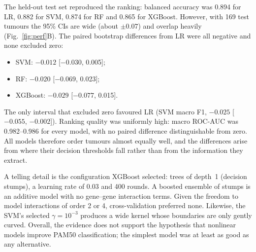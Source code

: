 \documentclass[10pt,twocolumn]{article}
\begin{document}
The held-out test set reproduced the ranking: balanced accuracy was 0.894 for LR, 0.882 for SVM, 0.874 for RF and 0.865 for XGBoost. However, with 169 test tumours the 95\% CIs are wide (about $\pm0.07$) and overlap heavily (Fig.~\ref{fig:perf}B). The paired bootstrap differences from LR were all negative and none excluded zero:
\begin{itemize}
\item SVM: $-0.012$ [$-0.030$, 0.005];
\item RF: $-0.020$ [$-0.069$, 0.023];
\item XGBoost: $-0.029$ [$-0.077$, 0.015].
\end{itemize}
The only interval that excluded zero favoured LR (SVM macro F1, $-0.025$ [$-0.055$, $-0.002$]). Ranking quality was uniformly high: macro ROC-AUC was 0.982--0.986 for every model, with no paired difference distinguishable from zero. All models therefore order tumours almost equally well, and the differences arise from where their decision thresholds fall rather than from the information they extract.

A telling detail is the configuration XGBoost selected: trees of depth~1 (decision stumps), a learning rate of 0.03 and 400 rounds. A boosted ensemble of stumps is an additive model with no gene--gene interaction terms. Given the freedom to model interactions of order 2 or 4, cross-validation preferred none. Likewise, the SVM's selected $\gamma=10^{-3}$ produces a wide kernel whose boundaries are only gently curved. Overall, the evidence does not support the hypothesis that nonlinear models improve PAM50 classification; the simplest model was at least as good as any alternative.
\end{document}
